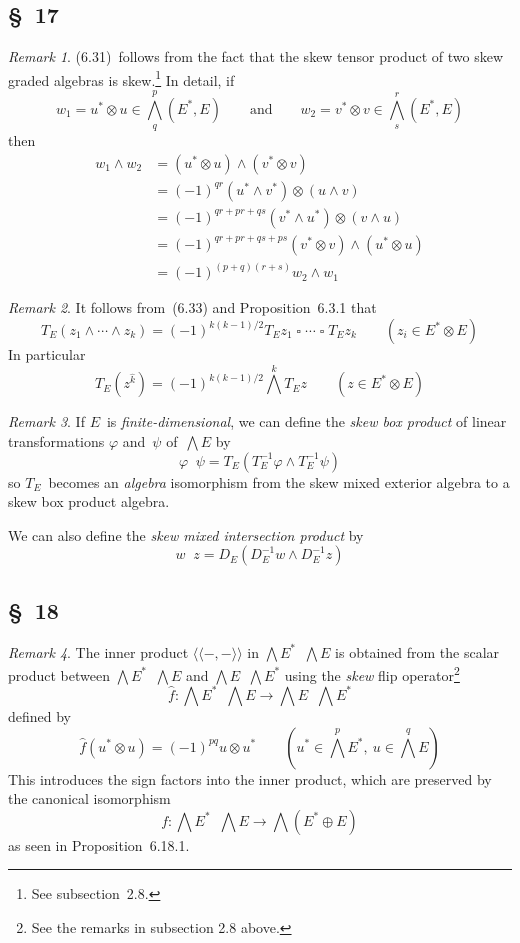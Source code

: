 \documentclass[letterpaper,12pt]{article}
\newcommand{\ssect}{\mathop{\widehat{\cap}}}
\newcommand{\dsum}{\oplus}
\newcommand{\tprod}{\otimes}
\newcommand{\stprod}{\mathop{\widehat{\otimes}}}
\newcommand{\eprod}{\wedge}
\newcommand{\bigeprod}{\bigwedge}
\newcommand{\medeprod}{{\textstyle\bigeprod}}
\newcommand{\bprod}{\mathop{\square}}
\newcommand{\sbprod}{\mathop{\widehat{\square}}}
\newcommand{\ssprod}[2]{\langle\!\langle#1,#2\rangle\!\rangle}
\newcommand{\multi}[4]{#2_{#3}#1\cdots#1#2_{#4}}
\newcommand{\eprods}[3]{\multi{\eprod}{#1}{#2}{#3}}
\newcommand{\bprods}[3]{\multi{\bprod}{#1}{#2}{#3}}
\theoremstyle{definition}
\theoremstyle{remark}
\newtheorem*{rmk}{Remark}
\begin{document}
\subsection*{\S~17}
\begin{rmk}
(6.31)~follows from the fact that the skew tensor product of two skew graded algebras is skew.\footnote{See subsection~2.8.} In detail, if
\[w_1=u^*\tprod u\in\medeprod^p_q(E^*,E)\qquad\text{and}\qquad w_2=v^*\tprod v\in\medeprod^r_s(E^*,E)\]
then
\begin{align*}
w_1\eprod w_2&=(u^*\tprod u)\eprod(v^*\tprod v)\\
	&=(-1)^{qr}(u^*\eprod v^*)\tprod(u\eprod v)\\
	&=(-1)^{qr+pr+qs}(v^*\eprod u^*)\tprod(v\eprod u)\\
	&=(-1)^{qr+pr+qs+ps}(v^*\tprod v)\eprod(u^*\tprod u)\\
	&=(-1)^{(p+q)(r+s)}w_2\eprod w_1
\end{align*}
\end{rmk}

\begin{rmk}
It follows from~(6.33) and Proposition~6.3.1 that
\[T_E(\eprods{z}{1}{k})=(-1)^{k(k-1)/2}\bprods{T_Ez}{1}{k}\qquad(z_i\in E^*\tprod E)\]
In particular
\[T_E(z^{\widehat{k}})=(-1)^{k(k-1)/2}\medeprod^k T_Ez\qquad(z\in E^*\tprod E)\]
\end{rmk}

\begin{rmk}
If \(E\)~is \emph{finite-dimensional}, we can define the \emph{skew box product} of linear transformations \(\varphi\) and~\(\psi\) of~\(\medeprod E\) by
\[\varphi\sbprod\psi=T_E(T_E^{-1}\varphi\eprod T_E^{-1}\psi)\]
so \(T_E\)~becomes an \emph{algebra} isomorphism from the skew mixed exterior algebra to a skew box product algebra.

We can also define the \emph{skew mixed intersection product} by
\[w\ssect z=D_E(D_E^{-1}w\eprod D_E^{-1}z)\]
\end{rmk}

\subsection*{\S~18}
\begin{rmk}
The inner product \(\ssprod{-}{-}\) in \(\medeprod E^*\stprod\medeprod E\) is obtained from the scalar product between \(\medeprod E^*\stprod\medeprod E\) and \(\medeprod E\stprod\medeprod E^*\) using the \emph{skew} flip operator\footnote{See the remarks in subsection 2.8 above.}
\[\widehat{f}:\medeprod E^*\stprod\medeprod E\to\medeprod E\stprod\medeprod E^*\]
defined by
\[\widehat{f}(u^*\tprod u)=(-1)^{pq}u\tprod u^*\qquad(u^*\in\medeprod^p E^*,\ u\in\medeprod^q E)\]
This introduces the sign factors into the inner product, which are preserved by the canonical isomorphism
\[f:\medeprod E^*\stprod\medeprod E\to\medeprod(E^*\dsum E)\]
as seen in Proposition~6.18.1.
\end{rmk}
\end{document}
